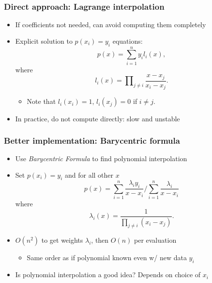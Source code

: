 \documentclass[bigger]{beamer}
\begin{document}
\begin{frame}%

\frametitle{Direct approach: Lagrange interpolation}

\begin{itemize}
\item If coefficients not needed, can avoid computing them completely
\item Explicit solution to $p(x_{i})=y_{i}$ equations: 
\begin{equation*}
p(x)=\sum_{i=1}^{n}y_{i}l_{i}(x),
\end{equation*}%
where 
\begin{equation*}
l_{i}(x)=\prod\nolimits_{j\neq i}\frac{x-x_{j}}{x_{i}-x_{j}}.
\end{equation*}

\begin{itemize}
\item Note that $l_{i}(x_{i})=1$, $l_{i}(x_{j})=0$ if $i\neq j$.
\end{itemize}

\item In practice, do not compute directly: slow and unstable


\end{itemize}


\end{frame}

\begin{frame}
\frametitle{Better implementation: Barycentric formula}

\begin{itemize}

\item Use \emph {Barycentric Formula} to find polynomial interpolation
\item Set $p(x_i)=y_i$ and for all other $x$
\begin{equation*}
p(x)=\sum_{i=1}^{n}\frac{\lambda_{i}y_{i}}{x-x_i}/\sum_{i=1}^{n}\frac{\lambda_{i}}{x-x_i}
\end{equation*}%
where 
\begin{equation*}
\lambda_{i}(x)=\frac{1}{\prod\nolimits_{j\neq i}({x_{i}-x_{j}})}.
\end{equation*}

\item $O(n^2)$ to get weights $\lambda_i$, then $O(n)$ per evaluation
\begin{itemize}
\item Same order as if polynomial known even w/ new data $y_i$
\end{itemize}

\item Is polynomial interpolation a good idea? Depends on choice of $x_i$

\end{itemize}

\end{frame}%
\end{document}
